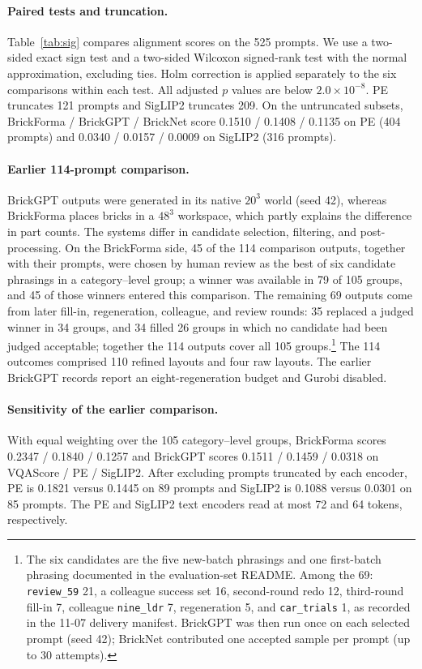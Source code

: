 \documentclass[letterpaper]{article} %
\begin{document}
\paragraph{Paired tests and truncation.}
Table~\ref{tab:sig} compares alignment scores on the 525 prompts. We use a two-sided exact sign test and a two-sided Wilcoxon signed-rank test with the normal approximation, excluding ties. Holm correction is applied separately to the six comparisons within each test. All adjusted $p$ values are below $2.0{\times}10^{-8}$. PE truncates 121 prompts and SigLIP2 truncates 209. On the untruncated subsets, BrickForma / BrickGPT / BrickNet score 0.1510 / 0.1408 / 0.1135 on PE (404 prompts) and 0.0340 / 0.0157 / 0.0009 on SigLIP2 (316 prompts).



\paragraph{Earlier 114-prompt comparison.} BrickGPT outputs were generated in its native $20^3$ world (seed 42), whereas BrickForma places bricks in a $48^3$ workspace, which partly explains the difference in part counts.
The systems differ in candidate selection, filtering, and post-processing.
On the BrickForma side, 45 of the 114 comparison outputs, together with their prompts, were chosen by human review as the best of six candidate phrasings in a category--level group; a winner was available in 79 of 105 groups, and 45 of those winners entered this comparison.
The remaining 69 outputs come from later fill-in, regeneration, colleague, and review rounds: 35 replaced a judged winner in 34 groups, and 34 filled 26 groups in which no candidate had been judged acceptable; together the 114 outputs cover all 105 groups.\footnote{The six candidates are the five new-batch phrasings and one first-batch phrasing documented in the evaluation-set README. Among the 69: \texttt{review\_59} 21, a colleague success set 16, second-round redo 12, third-round fill-in 7, colleague \texttt{nine\_ldr} 7, regeneration 5, and \texttt{car\_trials} 1, as recorded in the 11-07 delivery manifest. BrickGPT was then run once on each selected prompt (seed 42); BrickNet contributed one accepted sample per prompt (up to 30 attempts).}
The 114 outcomes comprised 110 refined layouts and four raw layouts. The earlier BrickGPT records report an eight-regeneration budget and Gurobi disabled.

\paragraph{Sensitivity of the earlier comparison.}
With equal weighting over the 105 category--level groups, BrickForma scores 0.2347 / 0.1840 / 0.1257 and BrickGPT scores 0.1511 / 0.1459 / 0.0318 on VQAScore / PE / SigLIP2. After excluding prompts truncated by each encoder, PE is 0.1821 versus 0.1445 on 89 prompts and SigLIP2 is 0.1088 versus 0.0301 on 85 prompts. The PE and SigLIP2 text encoders read at most 72 and 64 tokens, respectively.
\end{document}
